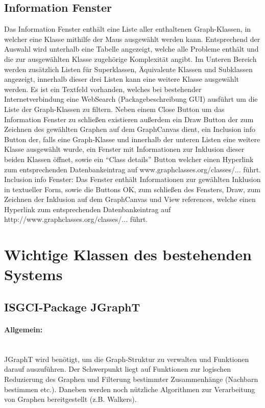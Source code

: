 \documentclass[10pt,a4paper]{article}
\begin{document}
\subsection{Information Fenster}
Das Information Fenster enthält eine Liste aller enthaltenen Graph-Klassen, in welcher eine Klasse mithilfe der Maus ausgewählt werden kann. Entsprechend der Auswahl wird unterhalb eine Tabelle angezeigt, welche alle Probleme enthält und die zur ausgewählten Klasse zugehörige Komplexität angibt. Im Unteren Bereich werden zusätzlich Listen für Superklassen, Äquivalente Klassen und Subklassen angezeigt, innerhalb dieser drei Listen kann eine weitere Klasse ausgewählt werden. Es ist ein Textfeld vorhanden, welches bei bestehender Internetverbindung eine WebSearch (Packagebeschreibung GUI) ausführt um die Liste der Graph-Klassen zu filtern. Neben einem Close Button um das Information Fenster zu schließen existieren außerdem ein Draw Button der zum Zeichnen des gewählten Graphen auf dem GraphCanvas dient, ein Inclusion info Button der, falls eine Graph-Klasse und innerhalb der unteren Listen eine weitere Klasse ausgewählt wurde, ein Fenster mit Informationen zur Inklusion dieser beiden Klassen öffnet, sowie ein "`Class details"' Button welcher einen Hyperlink zum entsprechenden Datenbankeintrag auf www.graphclasses.org/classes/... führt.\\
Inclusion info Fenster: Das Fenster enthält Informationen zur gewählten Inklusion in textueller Form, sowie die Buttons OK, zum schließen des Fensters, Draw, zum Zeichnen der Inklusion auf dem GraphCanvas und View references, welche einen Hyperlink zum entsprechenden Datenbankeintrag auf http://www.graphclasses.org/classes/... führt.
\newpage
\section{Wichtige Klassen des bestehenden Systems}
\subsection{ISGCI-Package JGraphT}

\paragraph{Allgemein:}\ \\
JGraphT wird benötigt, um die Graph-Struktur zu verwalten und Funktionen darauf auszuführen. Der Schwerpunkt liegt auf Funktionen zur logischen Reduzierung des Graphen und Filterung bestimmter Zusammenhänge (Nachbarn bestimmen etc.). Daneben werden noch nützliche Algorithmen zur Verarbeitung von Graphen bereitgestellt (z.B. Walkers).\\
\end{document}
